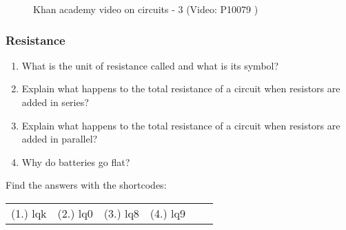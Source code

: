     \noindent
    \setcounter{subfigure}{0}
	\begin{figure}[H] %
    \textnormal{Khan academy video on circuits - 3}\vspace{.1in} \nopagebreak
  \label{m38776*yt-media3}\label{m38776*yt-video3}
             { (Video:  P10079 )}
      \vspace{2pt}
    \vspace{.1in}
 \end{figure}       
\label{m38776*secfhsst!!!underscore!!!id1795}
            \subsubsection{  Resistance }
            \nopagebreak
          \label{m38776*id67542}\begin{enumerate}[noitemsep, label=\textbf{\arabic*}. ] 
            \label{m38776*uid68}\item What is the unit of resistance called and what is its symbol?         
\label{m38776*uid69}\item Explain what happens to the total resistance of a circuit when resistors are added in series?         
\label{m38776*uid70}\item Explain what happens to the total resistance of a circuit when resistors are added in parallel?         
\label{m38776*uid71}\item Why do batteries go flat?         
\end{enumerate}
   \label{m38776*sb9871}
\par {} Find the answers with the shortcodes:
 \par \begin{tabular}[h]{cccccc}
 (1.) lqk  &  (2.) lq0  &  (3.) lq8  &  (4.) lq9  & \end{tabular}
